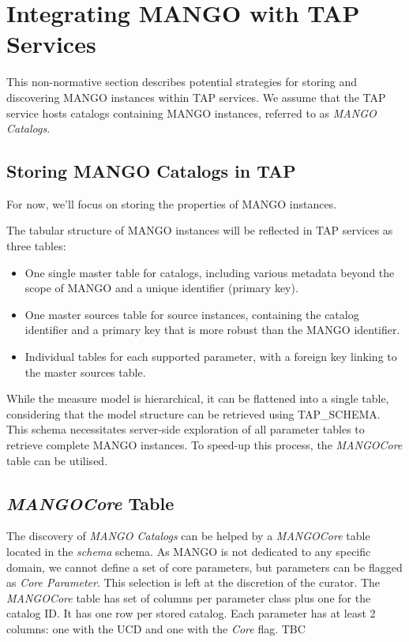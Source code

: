 \documentclass[11pt,a4paper]{ivoa}
\begin{document}



\section{Integrating MANGO with TAP Services}

This non-normative section describes potential strategies for
storing and discovering MANGO instances within TAP services.
We assume that the TAP service hosts catalogs containing MANGO instances,
referred to as  \emph{MANGO Catalogs}.

\subsection{Storing MANGO Catalogs in TAP}
For now, we'll focus on storing the properties of MANGO instances. 

The tabular structure of MANGO instances will be reflected in TAP services as three tables:

\begin{itemize}
  \item One single master table for catalogs, including various metadata beyond the scope of
        MANGO and a unique identifier (primary key).
  \item One master sources table for source instances, containing the catalog identifier
        and a primary key that is more robust than the MANGO identifier.
  \item Individual tables for each supported parameter, with a foreign key
        linking to the master sources table.
\end{itemize}

While the measure model is hierarchical, it can be flattened into a single table,
considering that the model structure can be retrieved using TAP\_SCHEMA.
This schema necessitates server-side exploration of all parameter tables
to retrieve complete MANGO instances.
To speed-up this process, the \emph{MANGOCore} table can be utilised.

\subsection{ \emph{MANGOCore} Table}

The discovery of \emph{MANGO Catalogs} can be helped by a  \emph{MANGOCore} table located in the  \emph{schema} schema. As MANGO is not dedicated to any specific domain, we cannot define a set of core parameters, but parameters can be flagged as \emph{Core Parameter}.
This selection is left at the discretion of the curator.
The \emph{MANGOCore} table has set of columns per parameter class plus one for the catalog ID.
It has one row per stored catalog. Each parameter has at least 2 columns: one with the UCD and one with the \emph{Core} flag. TBC
\end{document}
